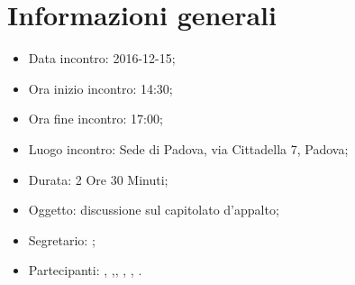 \documentclass[a4paper,11pt]{article}
\begin{document}
\section{Informazioni generali}
\begin{itemize}
\item {Data incontro:} 2016-12-15;
\item {Ora inizio incontro:} 14:30;
\item {Ora fine incontro:} 17:00;
\item {Luogo incontro:} \ZU Sede di Padova, via Cittadella 7, Padova; 
\item {Durata:} 2 Ore 30 Minuti;
\item {Oggetto:} discussione sul capitolato d’appalto;
\item {Segretario:} 	\LS; 
\item {Partecipanti:} \AZ, \GG ,\LB, \LL, \MM, \PB.
\end{itemize}
\end{document}
